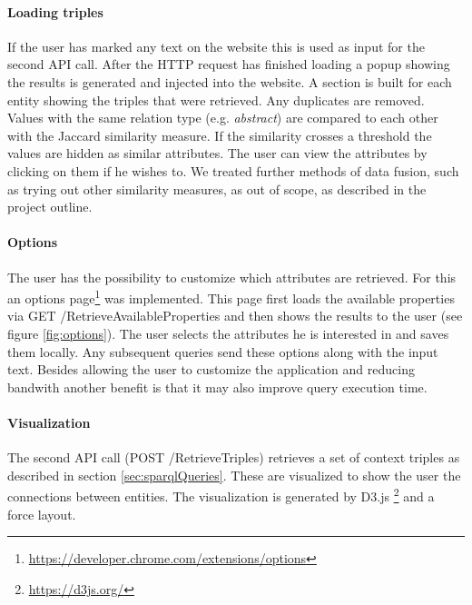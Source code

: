 \paragraph{Loading triples}
If the user has marked any text on the website this is used as input for the second API call. After the HTTP request has finished loading a popup showing the results is generated and injected into the website. A section is built for each entity showing the triples that were retrieved. Any duplicates are removed. Values with the same relation type (e.g. \textit{abstract}) are compared to each other with the Jaccard similarity measure. If the similarity crosses a threshold the values are hidden as similar attributes. The user can view the attributes by clicking on them if he wishes to. We treated further methods of data fusion, such as trying out other similarity measures, as out of scope, as described in the project outline. 


\paragraph{Options}
The user has the possibility to customize which attributes are retrieved. For this an options page\footnote{\url{https://developer.chrome.com/extensions/options}} was implemented. This page first loads the available properties via GET /RetrieveAvailableProperties and then shows the results to the user (see figure \ref{fig:options}). The user selects the attributes he is interested in and saves them locally. Any subsequent queries send these options along with the input text. Besides allowing the user to customize the application and reducing bandwith another benefit is that it may also improve query execution time. 


\paragraph{Visualization}
The second API call (POST /RetrieveTriples) retrieves a set of context triples as described in section \ref{sec:sparqlQueries}. These are visualized to show the user the connections between entities. The visualization is generated by D3.js \footnote{\url{https://d3js.org/}} and a force layout. %































